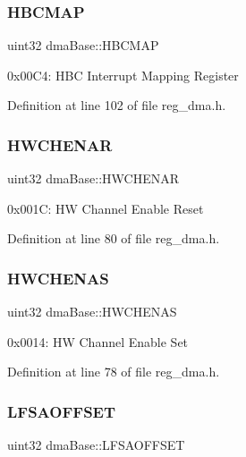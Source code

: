 \subsubsection{\texorpdfstring{H\+B\+C\+M\+AP}{HBCMAP}}
{\footnotesize\ttfamily uint32 dma\+Base\+::\+H\+B\+C\+M\+AP}

0x00\+C4\+: H\+BC Interrupt Mapping Register 

Definition at line 102 of file reg\+\_\+dma.\+h.

\mbox{\label{structdmaBase_ab8cd74d5174a8e1b353c2eb6fc499b64}} 
\subsubsection{\texorpdfstring{H\+W\+C\+H\+E\+N\+AR}{HWCHENAR}}
{\footnotesize\ttfamily uint32 dma\+Base\+::\+H\+W\+C\+H\+E\+N\+AR}

0x001C\+: HW Channel Enable Reset 

Definition at line 80 of file reg\+\_\+dma.\+h.

\mbox{\label{structdmaBase_ad7486c78d882f79753f38089a47d68d6}} 
\subsubsection{\texorpdfstring{H\+W\+C\+H\+E\+N\+AS}{HWCHENAS}}
{\footnotesize\ttfamily uint32 dma\+Base\+::\+H\+W\+C\+H\+E\+N\+AS}

0x0014\+: HW Channel Enable Set 

Definition at line 78 of file reg\+\_\+dma.\+h.

\mbox{\label{structdmaBase_ae880659547959979c0c0bff95b5e5ff3}} 
\subsubsection{\texorpdfstring{L\+F\+S\+A\+O\+F\+F\+S\+ET}{LFSAOFFSET}}
{\footnotesize\ttfamily uint32 dma\+Base\+::\+L\+F\+S\+A\+O\+F\+F\+S\+ET}


